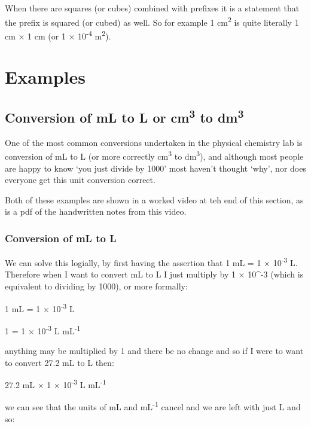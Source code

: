 \documentclass[
]{book}
\begin{document}
When there are squares (or cubes) combined with prefixes it is a statement that the prefix is squared (or cubed) as well. So for example 1 cm\textsuperscript{2} is quite literally 1 cm × 1 cm (or 1 × 10\textsuperscript{-4} m\textsuperscript{2}).

\hypertarget{examples}{%
\section{Examples}\label{examples}}

\hypertarget{conversion-of-ml-to-l-or-cm3-to-dm3}{%
\subsection{\texorpdfstring{Conversion of mL to L or cm\textsuperscript{3} to dm\textsuperscript{3}}{Conversion of mL to L or cm3 to dm3}}\label{conversion-of-ml-to-l-or-cm3-to-dm3}}

One of the most common conversions undertaken in the physical chemistry lab is conversion of mL to L (or more correctly cm\textsuperscript{3} to dm\textsuperscript{3}), and although most people are happy to know `you just divide by 1000' most haven't thought `why', nor does everyone get this unit conversion correct.

Both of these examples are shown in a worked video at teh end of this section, as is a pdf of the handwritten notes from this video.

\hypertarget{conversion-of-ml-to-l}{%
\subsubsection{Conversion of mL to L}\label{conversion-of-ml-to-l}}

We can solve this logially, by first having the assertion that 1 mL = 1 × 10\textsuperscript{-3} L. Therefore when I want to convert mL to L I just multiply by 1 × 10\^{}-3 (which is equivalent to dividing by 1000), or more formally:

1 mL = 1 × 10\textsuperscript{-3} L

1 = 1 × 10\textsuperscript{-3} L mL\textsuperscript{-1}

anything may be multiplied by 1 and there be no change and so if I were to want to convert 27.2 mL to L then:

27.2 mL × 1 × 10\textsuperscript{-3} L mL\textsuperscript{-1}

we can see that the units of mL and mL\textsuperscript{-1} cancel and we are left with just L and so:
\end{document}
